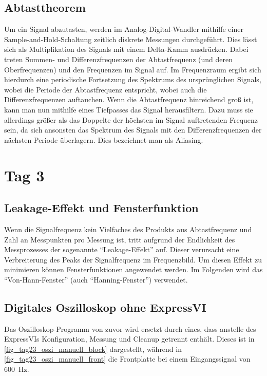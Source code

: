 \documentclass[
a4paper,
12pt,
pagesize,
ngerman
]{scrartcl}
\begin{document}
	\subsection{Abtasttheorem}
	Um ein Signal abzutasten, werden im Analog-Digital-Wandler mithilfe einer Sample-and-Hold-Schaltung zeitlich diskrete Messungen durchgeführt.
	Dies lässt sich als Multiplikation des Signals mit einem Delta-Kamm ausdrücken.
	Dabei treten Summen- und Differenzfrequenzen der Abtastfrequenz (und deren Oberfrequenzen) und den Frequenzen im Signal auf.
	Im Frequenzraum ergibt sich hierdurch eine periodische Fortsetzung des Spektrums des ursprünglichen Signals, wobei die Periode der Abtastfrequenz entspricht, wobei auch die Differenzfrequenzen auftauchen. %
	Wenn die Abtastfrequenz hinreichend groß ist, kann man nun mithilfe eines Tiefpasses das Signal herausfiltern.
	Dazu muss sie allerdings größer als das Doppelte der höchsten im Signal auftretenden Frequenz sein, da sich ansonsten das Spektrum des Signals mit den Differenzfrequenzen der nächsten Periode überlagern.
	Dies bezeichnet man als Aliasing.
	
	
	\section{Tag 3}
	\subsection{Leakage-Effekt und Fensterfunktion}
	\label{leakage}
	Wenn die Signalfrequenz kein Vielfaches des Produkts aus Abtastfrequenz und Zahl an Messpunkten pro Messung ist, tritt aufgrund der Endlichkeit des Messprozesses der sogenannte \enquote{Leakage-Effekt} auf. %
	Dieser verursacht eine Verbreiterung des Peaks der Signalfrequenz im Frequenzbild.
	Um diesen Effekt zu minimieren können Fensterfunktionen angewendet werden.
	Im Folgenden wird das \enquote{Von-Hann-Fenster} (auch \enquote{Hanning-Fenster}) verwendet. %
	
	\subsection{Digitales Oszilloskop ohne ExpressVI} %
	Das Oszilloskop-Programm von zuvor wird ersetzt durch eines, dass anstelle des ExpressVIs Konfiguration, Messung und Cleanup getrennt enthält.
	Dieses ist in \cref{fig_tag23_oszi_manuell_block} dargestellt, während in \cref{fig_tag23_oszi_manuell_front} die Frontplatte bei einem Eingangssignal von \SI{600}{\hertz}.
	
\end{document}
